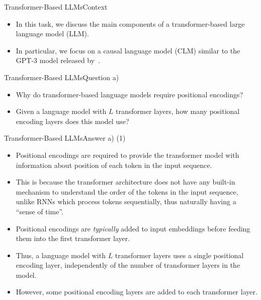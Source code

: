 \documentclass[t]{beamer}
\begin{document}
\begin{frame}{Transformer-Based LLMs}{Context}
    \begin{itemize}
        \item In this task, we discuss the main components of a
              transformer-based large language model (LLM).
        \item In particular, we focus on a causal language model (CLM) similar
              to the GPT-3 model released
              by~.
    \end{itemize}
\end{frame}

\begin{frame}{Transformer-Based LLMs}{Question a)}
    \begin{itemize}
        \item Why do transformer-based language models require positional
              encodings?
        \item Given a language model with $L$ transformer layers, how many
              positional encoding layers does this model use?
    \end{itemize}
\end{frame}

\begin{frame}{Transformer-Based LLMs}{Answer a) (1)}
    \begin{itemize}
        \item Positional encodings are required to provide the transformer model
              with information about position of each token in the input
              sequence.
        \item This is because the transformer architecture does not have any
              built-in mechanism to understand the order of the tokens in the
              input sequence, unlike RNNs which process tokens sequentially,
              thus naturally having a ``sense of time''.
        \item Positional encodings are \emph{typically} added to input
              embeddings before feeding them into the first transformer layer.
        \item Thus, a language model with $L$ transformer layers uses a single
              positional encoding layer, independently of the number of
              transformer layers in the model.
        \item However, some positional encoding layers are added to each
              transformer layer.
    \end{itemize}
\end{frame}
\end{document}
